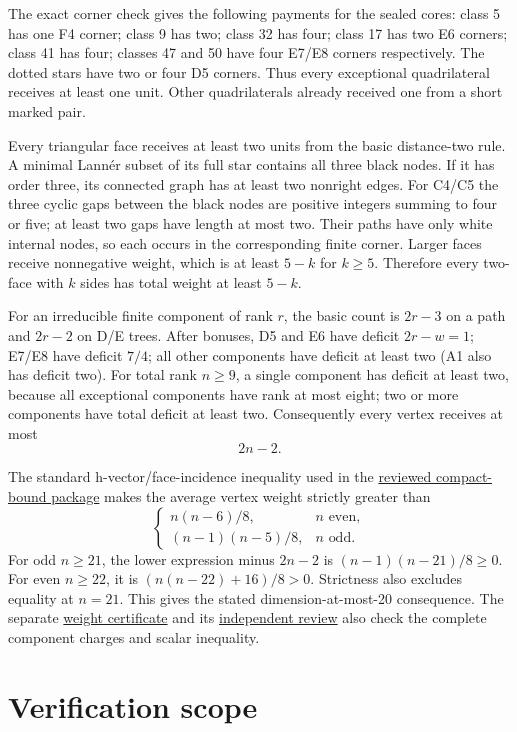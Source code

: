 \documentclass[
  10pt,
]{report}
\begin{document}
The exact corner check gives the following payments for the sealed
cores: class 5 has one F4 corner; class 9 has two; class 32 has four;
class 17 has two E6 corners; class 41 has four; classes 47 and 50 have
four E7/E8 corners respectively. The dotted stars have two or four D5
corners. Thus every exceptional quadrilateral receives at least one
unit. Other quadrilaterals already received one from a short marked
pair.

Every triangular face receives at least two units from the basic
distance-two rule. A minimal Lannér subset of its full star contains all
three black nodes. If it has order three, its connected graph has at
least two nonright edges. For C4/C5 the three cyclic gaps between the
black nodes are positive integers summing to four or five; at least two
gaps have length at most two. Their paths have only white internal
nodes, so each occurs in the corresponding finite corner. Larger faces
receive nonnegative weight, which is at least \(5-k\) for \(k\ge5\).
Therefore every two-face with \(k\) sides has total weight at least
\(5-k\).

For an irreducible finite component of rank \(r\), the basic count is
\(2r-3\) on a path and \(2r-2\) on D/E trees. After bonuses, D5 and E6
have deficit \(2r-w=1\); E7/E8 have deficit \(7/4\); all other
components have deficit at least two (A1 also has deficit two). For
total rank \(n\ge9\), a single component has deficit at least two,
because all exceptional components have rank at most eight; two or more
components have total deficit at least two. Consequently every vertex
receives at most \[
2n-2.
\]

The standard h-vector/face-incidence inequality used in the
\href{fresh_compact_dimension_bound_20261015.md}{reviewed compact-bound
package} makes the average vertex weight strictly greater than \[
\begin{cases}
n(n-6)/8,&n\text{ even},\\
(n-1)(n-5)/8,&n\text{ odd}.
\end{cases}
\] For odd \(n\ge21\), the lower expression minus \(2n-2\) is
\((n-1)(n-21)/8\ge0\). For even \(n\ge22\), it is \((n(n-22)+16)/8>0\).
Strictness also excludes equality at \(n=21\). This gives the stated
dimension-at-most-20 consequence. The separate
\href{fresh_sqrt2_weight_bound_20261015.md}{weight certificate} and its
\href{fresh_sqrt2_weight_bound_20261015_review.md}{independent review}
also check the complete component charges and scalar inequality.

\section{Verification scope}\label{verification-scope-2}
\end{document}
